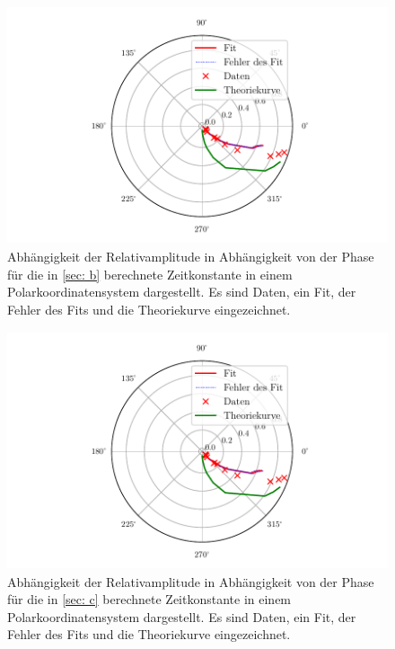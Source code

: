 \begin{figure}
  \centering
  \includegraphics[width=12cm, height=7cm]{build/plotd2.pdf}
  \caption{Abhängigkeit der Relativamplitude in Abhängigkeit von der Phase für die in \ref{sec: b} 
  berechnete Zeitkonstante in einem Polarkoordinatensystem dargestellt. Es sind Daten, ein Fit, der Fehler
  des Fits und die Theoriekurve eingezeichnet.}
  \label{fig: plotd2}
\end{figure}

\begin{figure}
  \centering
  \includegraphics[width=12cm, height=7cm]{build/plotd3.pdf}
  \caption{Abhängigkeit der Relativamplitude in Abhängigkeit von der Phase für die in \ref{sec: c} 
  berechnete Zeitkonstante in einem Polarkoordinatensystem dargestellt. Es sind Daten, ein Fit, der Fehler
  des Fits und die Theoriekurve eingezeichnet.}
  \label{fig: plotd3}
\end{figure}

